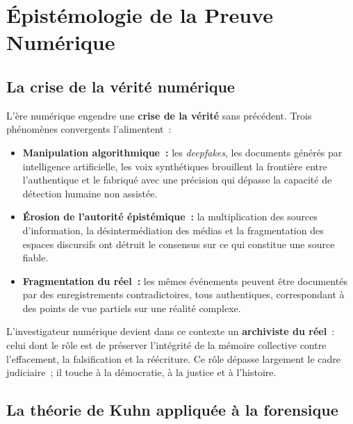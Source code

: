 \section{Épistémologie de la Preuve Numérique}

\subsection{La crise de la vérité numérique}

L'ère numérique engendre une \textbf{crise de la vérité} sans précédent.
Trois phénomènes convergents l'alimentent~:

\begin{itemize}
    \item \textbf{Manipulation algorithmique~:} les \textit{deepfakes}, les
          documents générés par intelligence artificielle, les voix synthétiques
          brouillent la frontière entre l'authentique et le fabriqué avec une
          précision qui dépasse la capacité de détection humaine non assistée.

    \item \textbf{Érosion de l'autorité épistémique~:} la multiplication des
          sources d'information, la désintermédiation des médias et la
          fragmentation des espaces discursifs ont détruit le consensus sur
          ce qui constitue une source fiable.

    \item \textbf{Fragmentation du réel~:} les mêmes événements peuvent être
          documentés par des enregistrements contradictoires, tous authentiques,
          correspondant à des points de vue partiels sur une réalité complexe.
\end{itemize}

L'investigateur numérique devient dans ce contexte un
\textbf{archiviste du réel}~: celui dont le rôle
est de préserver l'intégrité de la mémoire collective contre l'effacement,
la falsification et la réécriture. Ce rôle dépasse largement le cadre
judiciaire~; il touche à la démocratie, à la justice et à l'histoire.

\subsection{La théorie de Kuhn appliquée à la forensique}

